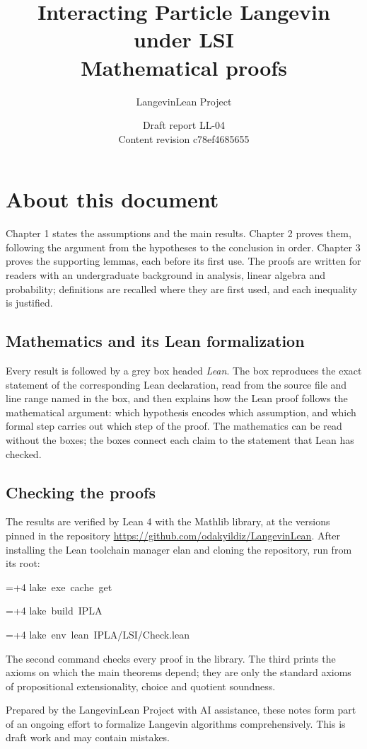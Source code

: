 \documentclass[11pt,a4paper]{report}
\title{\texorpdfstring{Interacting Particle Langevin under LSI}{Interacting Particle Langevin under LSI}\\[0.6em]\large Mathematical proofs}
\author{LangevinLean Project}
\date{Draft report LL-04\\[0.4em]\small Content revision c78ef4685655}
\newlength{\leancharwidth}
\newenvironment{leancode}{\par\smallskip\begingroup\ttfamily\footnotesize\raggedright
  \settowidth{\leancharwidth}{M}\setlength{\parskip}{0pt}\setlength{\parindent}{0pt}
  \frenchspacing}{\par\endgroup\smallskip}
\newcommand{\leanline}[2]{\hangindent=\dimexpr#1\leancharwidth+4\leancharwidth\relax
  \hangafter=1\noindent\hspace*{#1\leancharwidth}#2\par}
\begin{document}
\maketitle
\chapter*{About this document}
Chapter 1 states the assumptions and the main results. Chapter 2 proves them, following the argument from the hypotheses to the conclusion in order. Chapter 3 proves the supporting lemmas, each before its first use. The proofs are written for readers with an undergraduate background in analysis, linear algebra and probability; definitions are recalled where they are first used, and each inequality is justified.

\section*{Mathematics and its Lean formalization}
Every result is followed by a grey box headed \emph{Lean}. The box reproduces the exact statement of the corresponding Lean declaration, read from the source file and line range named in the box, and then explains how the Lean proof follows the mathematical argument: which hypothesis encodes which assumption, and which formal step carries out which step of the proof. The mathematics can be read without the boxes; the boxes connect each claim to the statement that Lean has checked.

\section*{Checking the proofs}
The results are verified by Lean 4 with the Mathlib library, at the versions pinned in the repository \url{https://github.com/odakyildiz/LangevinLean}. After installing the Lean toolchain manager elan and cloning the repository, run from its root:
\begin{leancode}
\leanline{0}{lake\ exe\ cache\ get}
\leanline{0}{lake\ build\ IPLA}
\leanline{0}{lake\ env\ lean\ IPLA/LSI/Check.lean}
\end{leancode}
The second command checks every proof in the library. The third prints the axioms on which the main theorems depend; they are only the standard axioms of propositional extensionality, choice and quotient soundness.

Prepared by the LangevinLean Project with AI assistance, these notes form part of an ongoing effort to formalize Langevin algorithms comprehensively. This is draft work and may contain mistakes.
\end{document}
